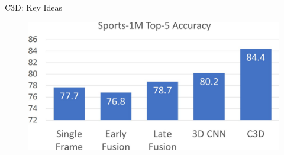 \begin{frame}[allowframebreaks]{C3D: Key Ideas}
\begin{figure}
        \includegraphics[width=1\textwidth,height=0.9\textheight,keepaspectratio]{images/video/slide_20_1_img.jpg}
    \end{figure}
\end{frame}